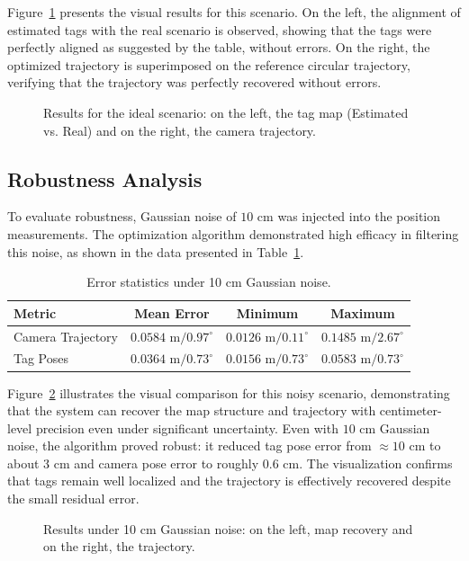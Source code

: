 Figure~\ref{fig:results_ideal} presents the visual results for this scenario. On the left, the alignment of estimated tags with the real scenario is observed, showing that the tags were perfectly aligned as suggested by the table, without errors. On the right, the optimized trajectory is superimposed on the reference circular trajectory, verifying that the trajectory was perfectly recovered without errors.


\begin{figure}[h!]
	\centering
	
	\caption{Results for the ideal scenario: on the left, the tag map (Estimated vs. Real) and on the right, the camera trajectory.}
	\label{fig:results_ideal}
\end{figure}

\subsection{Robustness Analysis }

To evaluate robustness, Gaussian noise of $10\text{ cm}$ was injected into the position measurements. The optimization algorithm demonstrated high efficacy in filtering this noise, as shown in the data presented in Table~\ref{tab:results_noise}.

\begin{table}[h!]
	\centering
	\begin{tabular}{|l|c|c|c|}
		\hline
		\textbf{Metric} & \textbf{Mean Error} & \textbf{Minimum} & \textbf{Maximum} \\ \hline
		Camera Trajectory & $0.0584\text{ m} / 0.97^\circ$ & $0.0126\text{ m} / 0.11^\circ$ & $0.1485\text{ m} / 2.67^\circ$ \\ \hline
		Tag Poses         & $0.0364\text{ m} / 0.73^\circ$ & $0.0156\text{ m} / 0.73^\circ$ & $0.0583\text{ m} / 0.73^\circ$ \\ \hline
	\end{tabular}
	\caption{Error statistics under 10 cm Gaussian noise.}
	\label{tab:results_noise}
\end{table}

Figure~\ref{fig:results_noise} illustrates the visual comparison for this noisy scenario, demonstrating that the system can recover the map structure and trajectory with centimeter-level precision even under significant uncertainty.
Even with $10\text{ cm}$ Gaussian noise, the algorithm proved robust: it reduced tag pose error from $\approx 10\text{ cm}$ to about $3\text{ cm}$ and camera pose error to roughly $0.6\text{ cm}$. The visualization confirms that tags remain well localized and the trajectory is effectively recovered despite the small residual error.

\begin{figure}[h!]
	\centering
	
	\caption{Results under 10 cm Gaussian noise: on the left, map recovery and on the right, the trajectory.}
	\label{fig:results_noise}
\end{figure}
